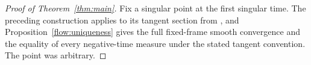 \begin{proof}[Proof of Theorem~\ref{thm:main}]
Fix a singular point at the first singular time.  The preceding
construction applies to its tangent section from ,
and Proposition~\ref{flow:uniqueness} gives the full fixed-frame smooth
convergence and the equality of every negative-time measure under the
stated tangent convention.  The point was arbitrary.
\end{proof}
